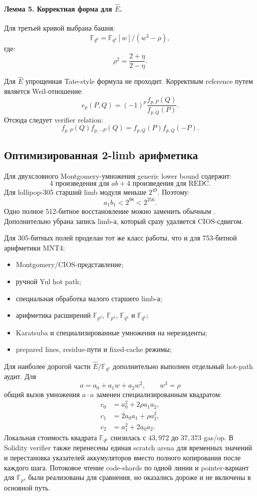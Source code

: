 \documentclass[12pt,a4paper]{article}
\newcommand{\code}[1]{\texttt{\detokenize{#1}}}
\begin{document}
\paragraph{Лемма 5. Корректная форма для $\widehat E$.}
Для третьей кривой выбрана башня:
\[
    \mathbb{F}_{q^6}
    =
    \mathbb{F}_{q^2}[w]/(w^3-\rho),
\]
где:
\[
    \rho^2=\frac{2+\eta}{2-\eta}.
\]

Для $\widehat E$ упрощенная Tate-style формула не проходит. Корректным
reference путем является Weil-отношение:
\[
    e_p(P,Q)
    =
    (-1)^p\frac{f_{p,P}(Q)}{f_{p,Q}(P)}.
\]
Отсюда следует verifier relation:
\[
    f_{p,P}(Q)f_{p,-P}(Q)
    =
    f_{p,Q}(P)f_{p,Q}(-P).
\]

\subsection{Оптимизированная 2-limb арифметика}

Для двухсловного Montgomery-умножения generic lower bound содержит:
\[
    4\text{ произведения для }ab+
    4\text{ произведения для REDC}.
\]
Для lollipop-305 старший limb модуля меньше $2^{49}$. Поэтому:
\[
    a_1b_1<2^{98}<2^{256}.
\]
Одно полное 512-битное восстановление можно заменить обычным \code{MUL}.
Дополнительно убрана запись limb-а, который сразу удаляется CIOS-сдвигом.

Для 305-битных полей проделан тот же класс работы, что и для 753-битной арифметики MNT4:
\begin{itemize}
    \item Montgomery/CIOS-представление;
    \item ручной Yul hot path;
    \item специальная обработка малого старшего limb-а;
    \item арифметика расширений $\mathbb{F}_{p^2}$,
    $\mathbb{F}_{p^4}$, $\mathbb{F}_{q^2}$ и $\mathbb{F}_{q^6}$;
    \item Karatsuba и специализированные умножения на нерезиденты;
    \item prepared lines, residue-пути и fixed-cache режимы;
\end{itemize}

Для наиболее дорогой части $\widehat E/\mathbb{F}_{q^2}$ дополнительно
выполнен отдельный hot-path аудит. Для
\[
    a=a_0+a_1w+a_2w^2,\qquad w^3=\rho
\]
общий вызов умножения $a\cdot a$ заменен специализированным квадратом:
\[
\begin{aligned}
    c_0&=a_0^2+2\rho a_1a_2,\\
    c_1&=2a_0a_1+\rho a_2^2,\\
    c_2&=a_1^2+2a_0a_2.
\end{aligned}
\]
Локальная стоимость квадрата $\mathbb{F}_{q^6}$ снизилась с $43{,}972$ до
$37{,}373$ gas/op. В Solidity verifier также перенесены единая scratch arena
для временных значений и перестановка указателей аккумуляторов вместо полного
копирования после каждого шага. Потоковое чтение code-shards по одной линии и
pointer-вариант для $\mathbb{F}_{p^4}$ были реализованы для сравнения, но
оказались дороже и не включены в основной путь.
\end{document}
